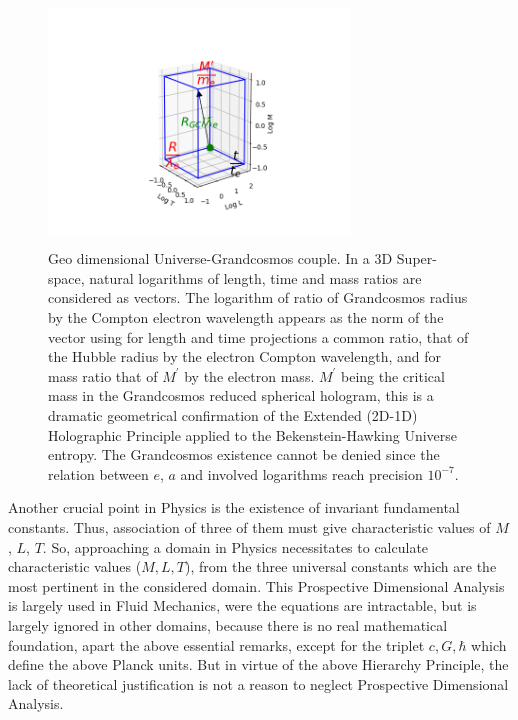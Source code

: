 \documentclass[twoside,draft]{article}
\begin{document}
\begin{sloppypar}
{\begin{figure}[h]
\centering
\includegraphics[width=8cm,height=6.5cm]{./figures/triaxis.png}
\caption{Geo dimensional Universe-Grandcosmos couple. In a 3D Super-space, natural logarithms of length, time and mass ratios are considered as vectors. The logarithm of ratio of Grandcosmos radius by the Compton electron wavelength appears as the norm of the vector using for length and time projections a common ratio, that of the Hubble radius by the electron Compton wavelength, and for mass ratio that of $M^{\prime}$ by the electron mass. $M^{\prime}$ being the critical mass in the Grandcosmos reduced spherical hologram, this is a dramatic geometrical confirmation of the Extended (2D-1D) Holographic Principle applied to the Bekenstein-Hawking Universe entropy. The Grandcosmos existence cannot be denied since the relation between $e$, $a$ and involved logarithms reach precision $10^{-7}$.} 
\end{figure}

Another crucial point in Physics is the existence of invariant fundamental constants. Thus,
association of three of them must give characteristic values of $M$, $L$, $T$. So, approaching a domain in
Physics necessitates to calculate characteristic values ($M, L, T$), from the three universal constants
which are the most pertinent in the considered domain. This Prospective Dimensional Analysis is
largely used in Fluid Mechanics, were the equations are intractable, but is largely ignored in other
domains, because there is no real mathematical foundation, apart the above essential remarks, except for the triplet $c, G, \hbar$ which define the above Planck units. But
in virtue of the above Hierarchy Principle, the lack of theoretical justification is not a reason to
neglect Prospective Dimensional Analysis. 

}
\end{sloppypar}
\end{document}
